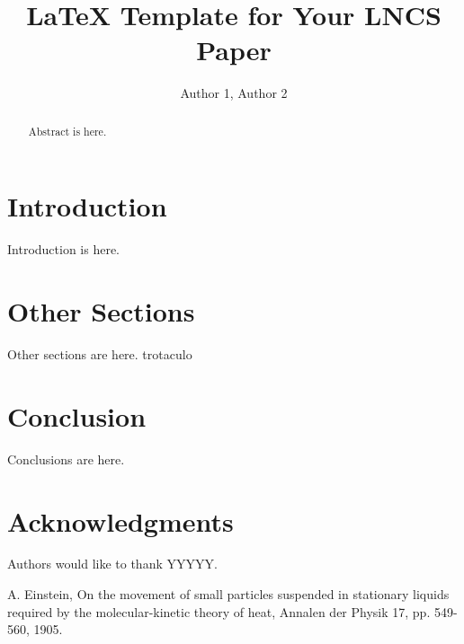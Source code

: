 \documentclass{llncs}
\begin{document}
\title{LaTeX Template for Your LNCS Paper}

\author{Author 1, Author 2}

\maketitle

\begin{abstract}

Abstract is here.

\end{abstract}

\section{Introduction}\label{sec:Introduction}

Introduction is here.

\section{Other Sections}\label{sec:Others}

Other sections are here. 
trotaculo

\section{Conclusion}\label{sec:Conclusion}

Conclusions are here.

\section*{Acknowledgments}\label{sec:Acknowledgments}

Authors would like to thank YYYYY.

\begin{thebibliography}{1}

A. Einstein, On the movement of small particles suspended in stationary liquids required by the molecular-kinetic theory of heat, Annalen der Physik 17, pp. 549-560, 1905.

\end{thebibliography}
\end{document}
